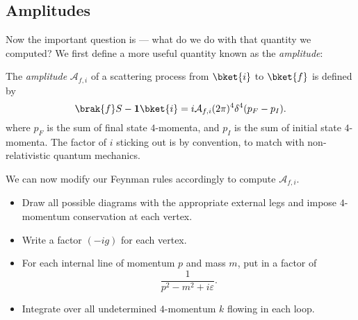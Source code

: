 \documentclass[a4paper]{article}
\begin{document}
\subsection{Amplitudes}
Now the important question is --- what do we do with that quantity we computed? We first define a more useful quantity known as the \emph{amplitude}:
\begin{defi}[Amplitude]
  The \emph{amplitude} $\mathcal{A}_{f,i}$ of a scattering process from $\bket{i}$ to $\bket{f}$ is defined by
  \[
    \brak{f}S - \mathbf{1}\bket{i} = i \mathcal{A}_{f,i} (2\pi)^4 \delta^4 (p_F - p_I).
  \]
  where $p_F$ is the sum of final state $4$-momenta, and $p_I$ is the sum of initial state $4$-momenta. The factor of $i$ sticking out is by convention, to match with non-relativistic quantum mechanics.
\end{defi}

We can now modify our Feynman rules accordingly to compute $\mathcal{A}_{f, i}$.

\begin{itemize}
  \item Draw all possible diagrams with the appropriate external legs and impose $4$-momentum conservation at each vertex.
  \item Write a factor $(-ig)$ for each vertex.
  \item For each internal line of momentum $p$ and mass $m$, put in a factor of
    \[
      \frac{1}{p^2 - m^2 + i \varepsilon}.
    \]
  \item Integrate over all undetermined $4$-momentum $k$ flowing in each loop.
\end{itemize}
\end{document}
